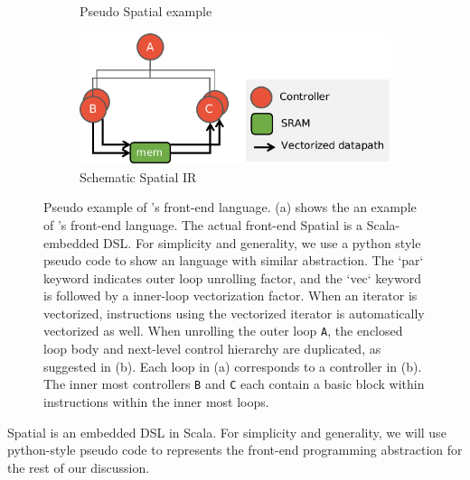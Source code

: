 \begin{figure}
\centering
\begin{subfigure}[b]{0.4\textwidth}
\inputminted{python}{code/spatialegpar.py}
\caption{Pseudo Spatial example}
\end{subfigure}
\hfill
\begin{subfigure}[b]{0.58\textwidth}
\includegraphics[width=1\textwidth]{figs/spatialir.pdf}
\caption{Schematic Spatial IR}
\end{subfigure}
\caption[Spatial Example]{
  Pseudo example of \name's front-end language.
  (a) shows the an example of \name's front-end language. The actual front-end Spatial is a
  Scala-embedded DSL. For simplicity and generality, we use a python style pseudo code to show an
  language with similar abstraction. The `par` keyword indicates outer loop unrolling factor, and
  the `vec` keyword is followed by a inner-loop vectorization factor.
  When an iterator is vectorized, instructions using the vectorized iterator is automatically
  vectorized as well. When unrolling the outer loop \texttt{A}, the enclosed loop body and
  next-level control hierarchy are duplicated, as suggested in (b).
  Each loop in (a) corresponds to a controller in (b). The inner most controllers \texttt{B} and
  \texttt{C} each contain a basic block within instructions within the inner most loops.
}
\label{fig:spatialegpar}
\end{figure}

Spatial is an embedded DSL in Scala.
For simplicity and generality, we will use python-style pseudo code to represents the front-end programming
abstraction for the rest of our discussion.
